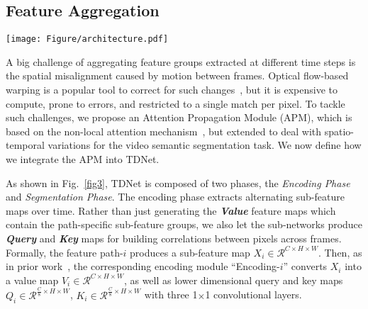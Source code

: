 \documentclass[10pt,twocolumn,letterpaper]{article}
\begin{document}
\subsection{Feature Aggregation}

\begin{figure*}[t!]
\centering
\texttt{[image: Figure/architecture.pdf]}
\caption{\small{Illustration of TDNet with four sub-networks. Since we circularly distribute sub-networks over sequential frames, any four-frame temporal window will cover a full set of the sub-networks. In order to segment frame \textit{t}, we apply the attention propagation module to propagate and merge sub-feature maps previously extracted from (\textit{t-3}, \textit{t-2}, \textit{t-1}) with the sub-feature map from \textit{t}. For the next frame \textit{t+1}, a full feature representation is aggregated by similarly reusing the sub-features extract at frames (\textit{t-2}, \textit{t-1}, \textit{t}). 
}}
\label{fig3}
\vspace{-0.3cm}
\end{figure*}
\label{sec_tda}

A big challenge of aggregating feature groups extracted at different time steps is the spatial misalignment caused by motion between frames.
Optical flow-based warping is a popular tool to correct for such changes~\cite{jain2019accel,zhu2017deep,gadde2017semantic,nilsson2018semantic}, but it is expensive to compute, prone to errors, and restricted to a single match per pixel. 
To tackle such challenges, we propose an Attention Propagation Module (APM), which is based on the non-local attention mechanism~\cite{vaswani2017attention,wang2018non,zhu2019empirical}, but extended to deal with spatio-temporal variations for the video semantic segmentation task.
We now define how we integrate the APM into TDNet. 

As shown in Fig.~\ref{fig3}, TDNet is composed of two phases, the \textit{Encoding Phase} and \textit{Segmentation Phase}. 
The encoding phase extracts alternating sub-feature maps over time. 
Rather than just generating the \textbf{\textit{Value}} feature maps which contain the path-specific sub-feature groups, we also let the sub-networks produce \textbf{\textit{Query}} and \textbf{\textit{Key}} maps for building correlations between pixels across frames. 
Formally, the feature path-$i$ produces a sub-feature map $X_i\in \mathcal{R}^{C\times H\times W}$. 
Then, as in prior work~\cite{vaswani2017attention}, the corresponding encoding module ``Encoding-$i$'' converts $X_i$ into a value map $V_i\in \mathcal{R}^{C\times H\times W}$, as well as lower dimensional query and key maps $Q_i\in \mathcal{R}^{\frac{C}{8}\times H\times W}$, $K_i\in \mathcal{R}^{\frac{C}{8}\times H\times W}$ with three 1$\times$1 convolutional layers.
\end{document}
